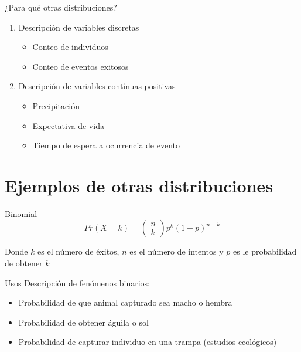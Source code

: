 \documentclass[
  11pt,
  ignorenonframetext,
]{beamer}
\providecommand{\tightlist}{%
  \setlength{\itemsep}{0pt}\setlength{\parskip}{0pt}}
\begin{document}
\begin{frame}{¿Para qué otras distribuciones?}
\protect\hypertarget{para-quuxe9-otras-distribuciones}{}
\begin{enumerate}
\item
  Descripción de variables discretas

  \begin{itemize}
  \tightlist
  \item
    Conteo de individuos
  \item
    Conteo de eventos exitosos
  \end{itemize}
\item
  Descripción de variables contínuas positivas

  \begin{itemize}
  \tightlist
  \item
    Precipitación
  \item
    Expectativa de vida
  \item
    Tiempo de espera a ocurrencia de evento
  \end{itemize}
\end{enumerate}
\end{frame}

\hypertarget{ejemplos-de-otras-distribuciones}{%
\section{Ejemplos de otras
distribuciones}\label{ejemplos-de-otras-distribuciones}}

\begin{frame}{Binomial}
\protect\hypertarget{binomial}{}
\begin{equation}
Pr(X = k) = \left( \begin{array}{c} n \\ k \end{array} \right) p^k (1-p)^{n-k}
\end{equation}

Donde \(k\) es el número de éxitos, \(n\) es el número de intentos y
\(p\) es le probabilidad de obtener \(k\)
\end{frame}

\begin{frame}{Usos}
\protect\hypertarget{usos}{}
Descripción de fenómenos binarios:

\begin{itemize}
\tightlist
\item
  Probabilidad de que animal capturado sea macho o hembra
\item
  Probabilidad de obtener águila o sol
\item
  Probabilidad de capturar individuo en una trampa (estudios ecológicos)
\end{itemize}
\end{frame}
\end{document}
